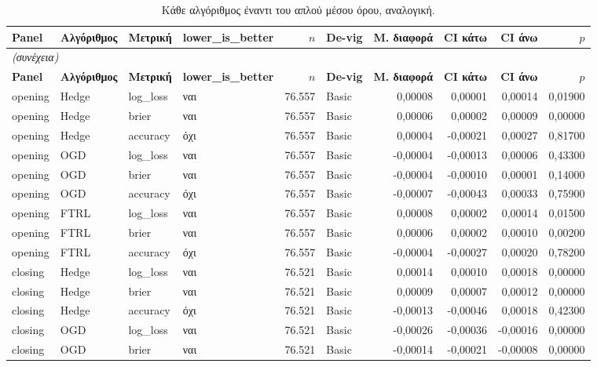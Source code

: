 {\scriptsize
\begin{longtable}{@{}llllrlrrrr@{}}
\caption{Κάθε αλγόριθμος έναντι του απλού μέσου όρου, αναλογική.}\label{app:vsuniαναλ}\\
\toprule \textbf{Panel} & \textbf{Αλγόριθμος} & \textbf{Μετρική} & \textbf{lower\_is\_better} & \textbf{$n$} & \textbf{De-vig} & \textbf{Μ. διαφορά} & \textbf{CI κάτω} & \textbf{CI άνω} & \textbf{$p$} \\\midrule\endfirsthead
\multicolumn{10}{l}{\emph{(συνέχεια)}}\\\toprule \textbf{Panel} & \textbf{Αλγόριθμος} & \textbf{Μετρική} & \textbf{lower\_is\_better} & \textbf{$n$} & \textbf{De-vig} & \textbf{Μ. διαφορά} & \textbf{CI κάτω} & \textbf{CI άνω} & \textbf{$p$} \\\midrule\endhead
\bottomrule\endfoot
opening & Hedge & log\_loss & ναι & 76.557 & Basic & 0,00008 & 0,00001 & 0,00014 & 0,01900 \\
opening & Hedge & brier & ναι & 76.557 & Basic & 0,00006 & 0,00002 & 0,00009 & 0,00000 \\
opening & Hedge & accuracy & όχι & 76.557 & Basic & 0,00004 & -0,00021 & 0,00027 & 0,81700 \\
opening & OGD & log\_loss & ναι & 76.557 & Basic & -0,00004 & -0,00013 & 0,00006 & 0,43300 \\
opening & OGD & brier & ναι & 76.557 & Basic & -0,00004 & -0,00010 & 0,00001 & 0,14000 \\
opening & OGD & accuracy & όχι & 76.557 & Basic & -0,00007 & -0,00043 & 0,00033 & 0,75900 \\
opening & FTRL & log\_loss & ναι & 76.557 & Basic & 0,00008 & 0,00002 & 0,00014 & 0,01500 \\
opening & FTRL & brier & ναι & 76.557 & Basic & 0,00006 & 0,00002 & 0,00010 & 0,00200 \\
opening & FTRL & accuracy & όχι & 76.557 & Basic & -0,00004 & -0,00027 & 0,00020 & 0,78200 \\
closing & Hedge & log\_loss & ναι & 76.521 & Basic & 0,00014 & 0,00010 & 0,00018 & 0,00000 \\
closing & Hedge & brier & ναι & 76.521 & Basic & 0,00009 & 0,00007 & 0,00012 & 0,00000 \\
closing & Hedge & accuracy & όχι & 76.521 & Basic & -0,00013 & -0,00046 & 0,00018 & 0,42300 \\
closing & OGD & log\_loss & ναι & 76.521 & Basic & -0,00026 & -0,00036 & -0,00016 & 0,00000 \\
closing & OGD & brier & ναι & 76.521 & Basic & -0,00014 & -0,00021 & -0,00008 & 0,00000 \\

\end{longtable}}
